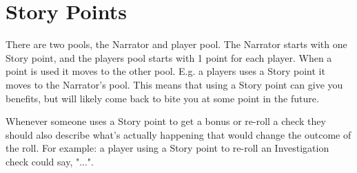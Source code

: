 


\chapter{Story Points}

There are two pools, the Narrator and player pool. 
The Narrator starts with one Story point, and the players pool starts with 1 point for each player.
When a point is used it moves to the other pool. E.g. a players uses a Story point it moves to the Narrator's pool.
This means that using a Story point can give you benefits, but will likely come back to bite you at some point in the future.
  
Whenever someone uses a Story point to get a bonus or re-roll a check 
they should also describe what's actually happening that would change the outcome of the roll.
For example: a player using a Story point to re-roll an Investigation check could say, 
"...". 

